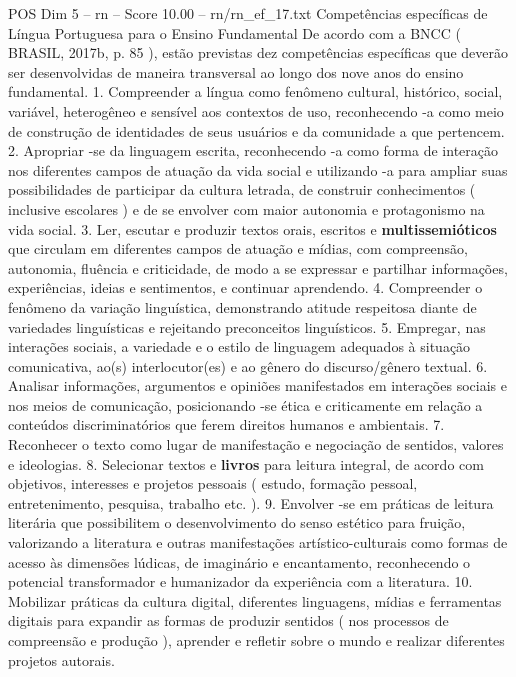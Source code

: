 \begin{textsample}{POS Dim 5 – rn – Score 10.00 – rn/rn\_ef\_17.txt}
Competências específicas de Língua Portuguesa para o Ensino Fundamental De acordo com a BNCC ( BRASIL, 2017b, p. 85 ), estão previstas dez competências específicas que deverão ser desenvolvidas de maneira transversal ao longo dos nove anos do ensino fundamental. 1.
Compreender a língua como fenômeno cultural, histórico, social, variável, heterogêneo e sensível aos contextos de uso, reconhecendo -a como meio de construção de identidades de seus usuários e da comunidade a que pertencem. 2.
Apropriar -se da linguagem escrita, reconhecendo -a como forma de interação nos diferentes campos de atuação da vida social e utilizando -a para ampliar suas possibilidades de participar da cultura letrada, de construir conhecimentos ( inclusive escolares ) e de se envolver com maior autonomia e protagonismo na vida social. 3.
Ler, escutar e produzir textos orais, escritos e \textbf{multissemióticos} que circulam em diferentes campos de atuação e mídias, com compreensão, autonomia, fluência e criticidade, de modo a se expressar e partilhar informações, experiências, ideias e sentimentos, e continuar aprendendo. 4.
Compreender o fenômeno da variação linguística, demonstrando atitude respeitosa diante de variedades linguísticas e rejeitando preconceitos linguísticos. 5.
Empregar, nas interações sociais, a variedade e o estilo de linguagem adequados à situação comunicativa, ao(s) interlocutor(es) e ao gênero do discurso/gênero textual. 6.
Analisar informações, argumentos e opiniões manifestados em interações sociais e nos meios de comunicação, posicionando -se ética e criticamente em relação a conteúdos discriminatórios que ferem direitos humanos e ambientais. 7.
Reconhecer o texto como lugar de manifestação e negociação de sentidos, valores e ideologias. 8.
Selecionar textos e \textbf{livros} para leitura integral, de acordo com objetivos, interesses e projetos pessoais ( estudo, formação pessoal, entretenimento, pesquisa, trabalho etc. ). 9.
Envolver -se em práticas de leitura literária que possibilitem o desenvolvimento do senso estético para fruição, valorizando a literatura e outras manifestações artístico-culturais como formas de acesso às dimensões lúdicas, de imaginário e encantamento, reconhecendo o potencial transformador e humanizador da experiência com a literatura. 10.
Mobilizar práticas da cultura digital, diferentes linguagens, mídias e ferramentas digitais para expandir as formas de produzir sentidos ( nos processos de compreensão e produção ), aprender e refletir sobre o mundo e realizar diferentes projetos autorais.

\end{textsample}
